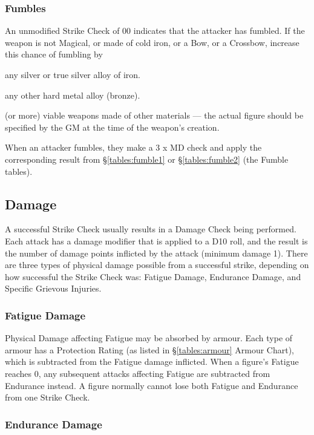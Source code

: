 \begin{multicols*}{3}
\subsubsection{Fumbles}
\label{combat:fumbles}

An unmodified Strike Check of 00 indicates that the attacker has
fumbled. If the weapon is not Magical, or made of cold iron, or a
Bow, or a Crossbow, increase this chance of fumbling by
\begin{Description}
\item[1\%] any silver or true silver alloy of iron.
\item[2\%] any other hard metal alloy (\eg bronze).
\item[3\%] (or more) viable weapons made of other materials ---
the actual figure should be specified by the GM at the time of the
weapon's creation.
\end{Description}
When an attacker fumbles, they make a 3 x MD check and apply the
corresponding result from \S\ref{tables:fumble1} or
\S\ref{tables:fumble2} (the Fumble tables).

\subsection{Damage}
\label{combat:damage}

A successful Strike Check usually results in a Damage Check being
performed. Each attack has a damage modifier that is applied to a D10
roll, and the result is the number of damage points inflicted by the
attack (minimum damage 1). There are three types of physical damage
possible from a successful strike, depending on how successful the
Strike Check was: Fatigue Damage, Endurance Damage, and Specific
Grievous Injuries.

\subsubsection{Fatigue Damage}

Physical Damage affecting Fatigue may be absorbed by armour. Each type
of armour has a Protection Rating (as listed in \S \ref{tables:armour}
Armour Chart), which is subtracted from the Fatigue damage
inflicted. When a figure's Fatigue reaches 0, any subsequent attacks
affecting Fatigue are subtracted from Endurance instead. A figure
normally cannot lose both Fatigue and Endurance from one Strike Check.

\subsubsection{Endurance Damage}


\end{multicols*}

